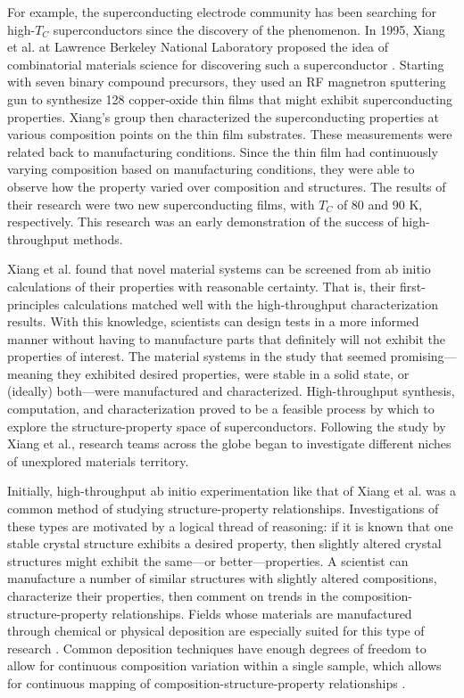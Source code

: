 For example, the superconducting electrode community has been searching for high-$T_C$ superconductors since the discovery of the phenomenon. In 1995, Xiang et al. at Lawrence Berkeley National Laboratory proposed the idea of combinatorial materials science for discovering such a superconductor \cite{Xiang1995}. Starting with seven binary compound precursors, they used an RF magnetron sputtering gun to synthesize 128 copper-oxide thin films that might exhibit superconducting properties. Xiang's group then characterized the superconducting properties at various composition points on the thin film substrates. These measurements were related back to manufacturing conditions. Since the thin film had continuously varying composition based on manufacturing conditions, they were able to observe how the property varied over composition and structures. The results of their research were two new superconducting films, with $T_C$ of 80 and 90 K, respectively. This research was an early demonstration of the success of high-throughput methods.

Xiang et al. found that novel material systems can be screened from ab initio calculations of their properties with reasonable certainty. That is, their first-principles calculations matched well with the high-throughput characterization results. With this knowledge, scientists can design tests in a more informed manner without having to manufacture parts that definitely will not exhibit the properties of interest. The material systems in the study that seemed promising---meaning they exhibited desired properties, were stable in a solid state, or (ideally) both---were manufactured and characterized. High-throughput synthesis, computation, and characterization proved to be a feasible process by which to explore the structure-property space of superconductors. Following the study by Xiang et al., research teams across the globe began to investigate different niches of unexplored materials territory. 

Initially, high-throughput ab initio experimentation like that of Xiang et al. was a common method of studying structure-property relationships. Investigations of these types are motivated by a logical thread of reasoning: if it is known that one stable crystal structure exhibits a desired property, then slightly altered crystal structures might exhibit the same---or better---properties. A scientist can manufacture a number of similar structures with slightly altered compositions, characterize their properties, then comment on trends in the composition-structure-property relationships. Fields whose materials are manufactured through chemical or physical deposition are especially suited for this type of research \cite{Koinuma2004}. Common deposition techniques have enough degrees of freedom to allow for continuous composition variation within a single sample, which allows for continuous mapping of composition-structure-property relationships \cite{Long2007, Long2009, Kusne2015a}. 

